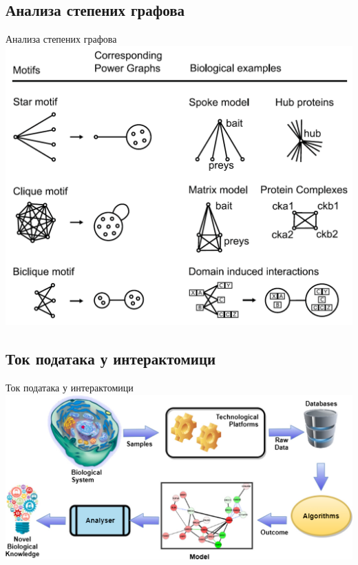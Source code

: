 \documentclass[hyperref={bookmarks=false}]{beamer}
\begin{document}
\subsection{Анализа степених графова}
\begin{frame}{Анализа степених графова}
\centering\includegraphics[width=.75\textwidth]{power_graph.png}
\end{frame}

\subsection{Ток података у интерактомици}
\begin{frame}{Ток података у интерактомици}
\centering\includegraphics[width=.95\textwidth]{tok.png}
\end{frame}
\end{document}
